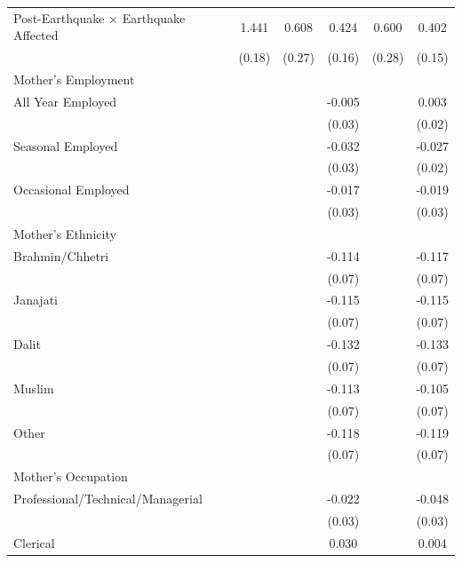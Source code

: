 \begin{longtable}{l*{5}{c}}
Post-Earthquake × Earthquake Affected & 1.441\sym{***} & 0.608\sym{**} & 0.424\sym{**} & 0.600\sym{**} & 0.402\sym{**} \\
                    & (0.18) & (0.27) & (0.16) & (0.28) & (0.15) \\
\multicolumn{6}{l}{Mother's Employment} \\
\hspace{1em}All Year Employed & & & -0.005 & & 0.003 \\
                    & & & (0.03) & & (0.02) \\
\hspace{1em}Seasonal Employed & & & -0.032 & & -0.027 \\
                    & & & (0.03) & & (0.02) \\
\hspace{1em}Occasional Employed & & & -0.017 & & -0.019 \\
                    & & & (0.03) & & (0.03) \\
\multicolumn{6}{l}{Mother's Ethnicity} \\
\hspace{1em}Brahmin/Chhetri & & & -0.114 & & -0.117\sym{*} \\
                    & & & (0.07) & & (0.07) \\
\hspace{1em}Janajati & & & -0.115 & & -0.115\sym{*} \\
                    & & & (0.07) & & (0.07) \\
\hspace{1em}Dalit & & & -0.132\sym{*} & & -0.133\sym{*} \\
                    & & & (0.07) & & (0.07) \\
\hspace{1em}Muslim & & & -0.113 & & -0.105 \\
                    & & & (0.07) & & (0.07) \\
\hspace{1em}Other & & & -0.118 & & -0.119\sym{*} \\
                    & & & (0.07) & & (0.07) \\
\multicolumn{6}{l}{Mother's Occupation} \\
\hspace{1em}Professional/Technical/Managerial & & & -0.022 & & -0.048 \\
                    & & & (0.03) & & (0.03) \\
\hspace{1em}Clerical & & & 0.030 & & 0.004 \\

\end{longtable}
